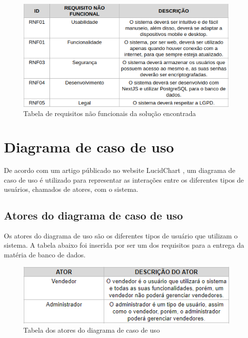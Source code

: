 \documentclass[serif, english, brazilian, oneside]{uffstex}
\begin{document}
\begin{figure}[!htpb]
    \centering
    \caption{Tabela de requisitos não funcionais da solução encontrada}
    \label{fig:req_nao_funcionais}
    \includegraphics[width=\linewidth]{imagens/req_nao_funcionais.png}
\end{figure}

\section{Diagrama de caso de uso}

De acordo com um artigo públicado no website LucidChart \cite{diagrama-de-caso-de-uso}, um diagrama de caso de uso é utilizado para representar as interações entre os diferentes tipos de usuários, chamados de atores, com o sistema.

\subsection{Atores do diagrama de caso de uso}

Os atores do diagrama de uso são os diferentes tipos de usuário que utilizam o sistema. A tabela abaixo foi inserida por ser um dos requisitos para a entrega da matéria de banco de dados.

\begin{figure}[!htpb]
    \centering
    \caption{Tabela dos atores do diagrama de caso de uso}
    \label{fig:atores_caso_uso}
    \includegraphics[width=0.7\linewidth]{imagens/atores_diagrama_caso_uso.png}
\end{figure}
\end{document}
